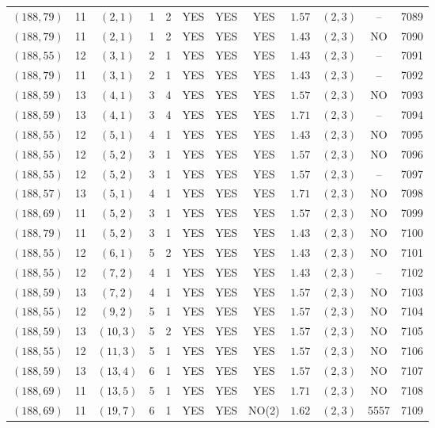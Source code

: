 \begin{longtable}{|c|c|c|c|c|c|c|c|c|c|c|c|}
$(188,79)$ & 11 & $(2,1)$ & 1 & 2 & YES & YES & YES & $1.57$ & $(2,3)$ & -- & 7089\\
$(188,79)$ & 11 & $(2,1)$ & 1 & 2 & YES & YES & YES & $1.43$ & $(2,3)$ & NO & 7090\\
$(188,55)$ & 12 & $(3,1)$ & 2 & 1 & YES & YES & YES & $1.43$ & $(2,3)$ & -- & 7091\\
$(188,79)$ & 11 & $(3,1)$ & 2 & 1 & YES & YES & YES & $1.43$ & $(2,3)$ & -- & 7092\\
$(188,59)$ & 13 & $(4,1)$ & 3 & 4 & YES & YES & YES & $1.57$ & $(2,3)$ & NO & 7093\\
$(188,59)$ & 13 & $(4,1)$ & 3 & 4 & YES & YES & YES & $1.71$ & $(2,3)$ & -- & 7094\\
$(188,55)$ & 12 & $(5,1)$ & 4 & 1 & YES & YES & YES & $1.43$ & $(2,3)$ & NO & 7095\\
$(188,55)$ & 12 & $(5,2)$ & 3 & 1 & YES & YES & YES & $1.57$ & $(2,3)$ & NO & 7096\\
$(188,55)$ & 12 & $(5,2)$ & 3 & 1 & YES & YES & YES & $1.57$ & $(2,3)$ & -- & 7097\\
$(188,57)$ & 13 & $(5,1)$ & 4 & 1 & YES & YES & YES & $1.71$ & $(2,3)$ & NO & 7098\\
$(188,69)$ & 11 & $(5,2)$ & 3 & 1 & YES & YES & YES & $1.57$ & $(2,3)$ & NO & 7099\\
$(188,79)$ & 11 & $(5,2)$ & 3 & 1 & YES & YES & YES & $1.43$ & $(2,3)$ & NO & 7100\\
$(188,55)$ & 12 & $(6,1)$ & 5 & 2 & YES & YES & YES & $1.43$ & $(2,3)$ & NO & 7101\\
$(188,55)$ & 12 & $(7,2)$ & 4 & 1 & YES & YES & YES & $1.43$ & $(2,3)$ & -- & 7102\\
$(188,59)$ & 13 & $(7,2)$ & 4 & 1 & YES & YES & YES & $1.57$ & $(2,3)$ & NO & 7103\\
$(188,55)$ & 12 & $(9,2)$ & 5 & 1 & YES & YES & YES & $1.57$ & $(2,3)$ & NO & 7104\\
$(188,59)$ & 13 & $(10,3)$ & 5 & 2 & YES & YES & YES & $1.57$ & $(2,3)$ & NO & 7105\\
$(188,55)$ & 12 & $(11,3)$ & 5 & 1 & YES & YES & YES & $1.57$ & $(2,3)$ & NO & 7106\\
$(188,59)$ & 13 & $(13,4)$ & 6 & 1 & YES & YES & YES & $1.57$ & $(2,3)$ & NO & 7107\\
$(188,69)$ & 11 & $(13,5)$ & 5 & 1 & YES & YES & YES & $1.71$ & $(2,3)$ & NO & 7108\\
$(188,69)$ & 11 & $(19,7)$ & 6 & 1 & YES & YES & NO(2) & $1.62$ & $(2,3)$ & 5557 & 7109\\

\end{longtable}
